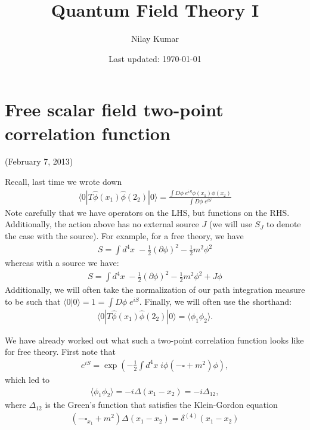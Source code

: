 \documentclass{../mathnotes}
\title{Quantum Field Theory I}
\author{Nilay Kumar}
\date{Last updated: \today}
\begin{document}
\maketitle

\section{Free scalar field two-point correlation function}

(February 7, 2013)

Recall, last time we wrote down
\begin{align*}
    \langle 0|T\hat{\phi}(x_1)\hat{\phi}(2_2)|0\rangle = \frac{\int D\phi\; e^{iS}\phi(x_1)\phi(x_2)}{\int D\phi\;e^{iS}}
\end{align*}
Note carefully that we have operators on the LHS, but functions on the RHS. Additionally, the action above has no external source $J$
(we will use $S_J$ to denote the case with the source). For example, for a free theory, we have
\begin{align*}
    S=\int d^4 x\;-\frac{1}{2}(\partial \phi)^2-\frac{1}{2}m^2\phi^2
\end{align*}
whereas with a source we have:
\begin{align*}
    S=\int d^4 x\;-\frac{1}{2}(\partial \phi)^2-\frac{1}{2}m^2\phi^2+J\phi
\end{align*}
Additionally, we will often take the normalization of our path integration measure to be such that $\langle 0|0\rangle=1=\int D\phi\; e^{iS}$.
Finally, we will often use the shorthand:
\begin{align*}
    \langle 0|T\hat{\phi}(x_1)\hat{\phi}(2_2)|0\rangle=\langle \phi_1 \phi_2\rangle.
\end{align*}

We have already worked out what such a two-point correlation function looks like for free theory. First note that
\begin{align*}
    e^{iS}=\exp\left(-\frac{1}{2}\int d^4x\;i\phi\left( -\square+m^2 \right)\phi\right),
\end{align*}
which led to
\begin{align*}
    \langle \phi_1\phi_2\rangle=-i\Delta(x_1-x_2)=-i\Delta_{12},
\end{align*}
where $\Delta_{12}$ is the Green's function that satisfies the Klein-Gordon equation
\begin{align*}
    \left( -\square_{x_1}+m^2 \right)\Delta(x_1-x_2)=\delta^{(4)}(x_1-x_2)
\end{align*}
\end{document}
